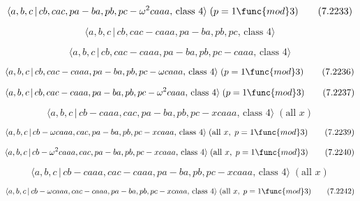 \documentclass[10pt]{article}
\begin{document}
\begin{equation}
\langle a,b,c\,|\,cb,cac,pa-ba,pb,pc-\omega ^{2}caaa,\,\text{class }4\rangle
\;(p=1\func{mod}3)  \tag{7.2233}
\end{equation}

\begin{equation}
\langle a,b,c\,|\,cb,cac-caaa,pa-ba,pb,pc,\,\text{class }4\rangle 
\tag{7.2234}
\end{equation}

\begin{equation}
\langle a,b,c\,|\,cb,cac-caaa,pa-ba,pb,pc-caaa,\,\text{class }4\rangle 
\tag{7.2235}
\end{equation}

\begin{equation}
\langle a,b,c\,|\,cb,cac-caaa,pa-ba,pb,pc-\omega caaa,\,\text{class }%
4\rangle \;(p=1\func{mod}3)  \tag{7.2236}
\end{equation}

\begin{equation}
\langle a,b,c\,|\,cb,cac-caaa,pa-ba,pb,pc-\omega ^{2}caaa,\,\text{class }%
4\rangle \;(p=1\func{mod}3)  \tag{7.2237}
\end{equation}

\begin{equation}
\langle a,b,c\,|\,cb-caaa,cac,pa-ba,pb,pc-xcaaa,\,\text{class }4\rangle \;(%
\text{all }x)  \tag{7.2238}
\end{equation}

\begin{equation}
\langle a,b,c\,|\,cb-\omega caaa,cac,pa-ba,pb,pc-xcaaa,\,\text{class }%
4\rangle \;(\text{all }x,\;p=1\func{mod}3)  \tag{7.2239}
\end{equation}

\begin{equation}
\langle a,b,c\,|\,cb-\omega ^{2}caaa,cac,pa-ba,pb,pc-xcaaa,\,\text{class }%
4\rangle \;(\text{all }x,\;p=1\func{mod}3)  \tag{7.2240}
\end{equation}

\begin{equation}
\langle a,b,c\,|\,cb-caaa,cac-caaa,pa-ba,pb,pc-xcaaa,\,\text{class }4\rangle
\;(\text{all }x)  \tag{7.2241}
\end{equation}

\begin{equation}
\langle a,b,c\,|\,cb-\omega caaa,cac-caaa,pa-ba,pb,pc-xcaaa,\,\text{class }%
4\rangle \;(\text{all }x,\;p=1\func{mod}3)  \tag{7.2242}
\end{equation}
\end{document}
